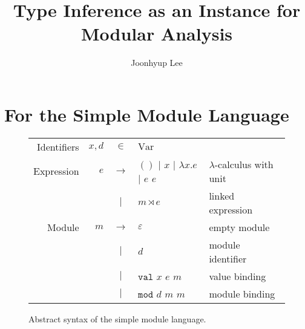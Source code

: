 \documentclass{article}
\title{Type Inference as an Instance for Modular Analysis}
\author{Joonhyup Lee}
\theoremstyle{definition}
\newcommand*{\vbar}{|}
\newcommand*{\ExprVar}{\text{Var}}
\newcommand*{\modid}{d}
\newcommand*{\link}[2]{{#1}\rtimes{#2}}
\newcommand*{\Lete}{\mathtt{val}}
\newcommand*{\Letm}{\mathtt{mod}}
\begin{document}
\maketitle
\section{For the Simple Module Language}
\begin{figure}[htb]
	\centering
	\begin{tabular}{rrcll}
		Identifiers & $x,\modid$ & $\in$         & $\ExprVar$                                                                            \\
		Expression  & $e$        & $\rightarrow$ & $()$ $\vbar$ $x$ $\vbar$ $\lambda x.e$ $\vbar$ $e$ $e$ & $\lambda$-calculus with unit \\
		            &            & $\vbar$       & $\link{m}{e}$                                          & linked expression            \\
		Module      & $m$        & $\rightarrow$ & $\varepsilon$                                          & empty module                 \\
		            &            & $\vbar$       & $\modid$                                               & module identifier            \\
		            &            & $\vbar$       & $\Lete$ $x$ $e$ $m$                                    & value binding                \\
		            &            & $\vbar$       & $\Letm$ $\modid$ $m$ $m$                               & module binding               \\
	\end{tabular}
	\caption{Abstract syntax of the simple module language.}
	\label{fig:syntax}
\end{figure}
\end{document}

